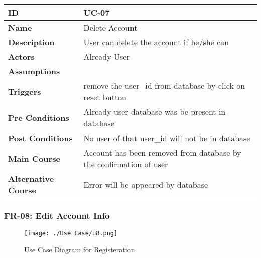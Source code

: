     \begin{center}
        \begin{tabularx}{\textwidth}{|l|X|}
            \hline
            \textbf{ID} & UC-07 \\
            \hline
            \textbf{Name} & Delete Account \\
            \hline
            \textbf{Description} & User can delete the account if he/she can \\
            \hline
            \textbf{Actors} & Already User \\
            \hline
            \textbf{Assumptions} &  \\
            \hline
            \textbf{Triggers} & remove the user\_id from database by click on reset button \\
            \hline
            \textbf{Pre Conditions} & Already user database was be present in database \\
            \hline
            \textbf{Post Conditions} & No user of that user\_id will not be in database \\
            \hline
            \textbf{Main Course} & Account has been removed from database by the confirmation of user \\
            \hline
            \textbf{Alternative Course} & Error will be appeared by database \\
            \hline
            
        \end{tabularx}
    \end{center}
    \newpage
    

    \subsubsection{FR-08: Edit Account Info}
    \begin{figure}[H]
        \texttt{[image: ./Use Case/u8.png]}
        \centering 
        \caption{Use Case Diagram for Registeration}
        \label{fig:prototype1}
        \end{figure}
        
